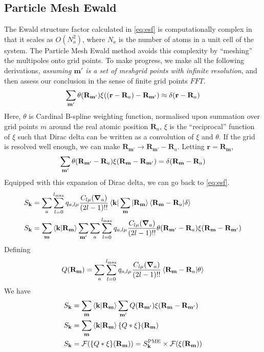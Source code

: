 \documentclass[12pt]{extarticle}
\renewcommand{\bf}{\mathbf}
\begin{document}
    \subsection{Particle Mesh Ewald}
    The Ewald structure factor calculated in \cref{eq:esf} is computationally complex in that it scales as \(O(N_a^2)\), where \(N_a\) is the number of atoms in a unit cell of the system. The Particle Mesh Ewald method avoids this complexity by ``meshing'' the multipoles onto grid points. To make progress, we make all the following derivations, \emph{assuming \(\bf m'\) is a set of meshgrid points with infinite resolution}, and then assess our conclusion in the sense of finite grid points \(FFT\).
    \begin{align*}
        \sum_{\bf m'} \theta(\bf R_{\bf m'}) \xi\pqty{\pqty{\bf r - \bf R_a} - \bf R_{\bf m'}} \approx \delta(\bf r -\bf R_a)
    \end{align*}
    Here, \(\theta\) is Cardinal B-spline weighting function, normalised upon summation over grid points \(m\) around the real atomic position \(\bf R_a\), \(\xi\) is the ``reciprocal'' function of \(\xi\) such that Dirac delta can be written as a convolution of \(\xi\) and \(\theta\). If the grid is resolved well enough, we can make \(\bf R_{\bf m'} \to \bf R_{\bf m'} - \bf R_a\). Letting \(\bf r = \bf R_{\bf m}\), 
    \begin{align*}
        \sum_{\bf m'} \theta(\bf R_{\bf m'} - \bf R_a) \xi\pqty{\bf R_{\bf m} - \bf R_{\bf m'}} = \delta(\bf R_{\bf m} - \bf R_a)
    \end{align*}
    Equipped with this expansion of Dirac delta, we can go back to \cref{eq:esf}. 
    \begin{align*}
        S_{\bf k} &= \sum_{a} \sum_{l = 0}^{l_{\max}} q_{a, l \mu} \frac{C_{l \mu} (\grad_a)}{(2l - 1)!!} \bra{\bf k} \sum_{\bf m} \ket{\bf R_{\bf m}} \bra{\bf R_{\bf m} - \bf R_a} \ket{ \delta}\\ 
        S_{\bf k} &= \sum_{\bf m} \bra{\bf k}  \ket{\bf R_{\bf m}}  \sum_{\bf m'} \sum_{a} \sum_{l = 0}^{l_{\max}} q_{a, l \mu} \frac{C_{l \mu} (\grad_a)}{(2l - 1)!!}  \theta(\bf R_{\bf m'} - \bf R_a) \xi\pqty{\bf R_{\bf m} - \bf R_{\bf m'}}
    \end{align*}
    Defining \[
        Q(\bf R_{\bf m}) = \sum_{a} \sum_{l = 0}^{l_{\max}} q_{a, l \mu} \frac{C_{l \mu} (\grad_a)}{(2l - 1)!!} \bra{\bf R_{\bf m} - \bf R_a} \ket{\theta}
    \]
    We have \begin{align*}
        S_{\bf k} &= \sum_{\bf m} \bra{\bf k}  \ket{\bf R_{\bf m}}  \sum_{\bf m'}  Q(\bf R_{\bf m'})\xi\pqty{\bf R_{\bf m} - \bf R_{\bf m'}}\\
        S_{\bf k} &= \sum_{\bf m} \bra{\bf k}  \ket{\bf R_{\bf m}} \qty{Q * \xi}\pqty{\bf R_{\bf m}}\\
        S_{\bf k} &= \mathcal{F} \pqty{\qty{Q * \xi}\pqty{\bf R_{\bf m}}} =S^\text{PME}_{\bf k} \times \mathcal{F} \pqty{\xi\pqty{\bf R_{\bf m}}}
    \end{align*}
\end{document}
